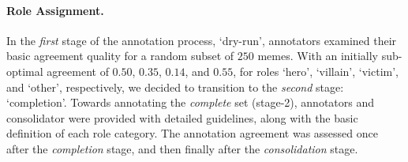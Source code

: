 \documentclass[11pt]{article}
\begin{document}
\paragraph{\bf Role Assignment.} In the \textit{first} stage of the annotation process, `dry-run', annotators examined their basic agreement quality for a random subset of $250$ memes. With an initially sub-optimal agreement of $0.50$, $0.35$, $0.14$, and $0.55$, for roles `hero', `villain', `victim', and `other', respectively, we decided to transition to the \textit{second} stage: `completion'. Towards annotating the \textit{complete} set (stage-2), annotators and consolidator were provided with detailed guidelines, along with the basic definition of each role category. The annotation agreement was assessed once after the \textit{completion} stage, and then finally after the \textit{consolidation} stage.



\end{document}
